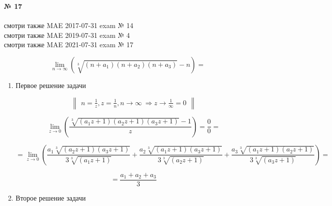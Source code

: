 \documentclass{article}
\begin{document}
\textbf{№ 17} 
\\
\\ смотри также {\color{red}MAE} 2017-07-31 exam № 14
\\ смотри также {\color{red}MAE} 2019-07-31 exam № 4
\\ смотри также {\color{red}MAE} 2021-07-31 exam № 17

\begingroup
$$ \lim_{n\to \infty} \left( \sqrt[3]{(n+a_1)(n+a_2)(n+a_3)} - n \right) 
= $$

\begin{enumerate}
\item Первое решение задачи

$$ \begin{Vmatrix} n=\frac{1}{z}, z=\frac{1}{n}, n\to \infty \ \Rightarrow z\to\frac{1}{\infty}=0 \end{Vmatrix} $$

$$ \lim_{z\to 0} \left(\frac{\sqrt[3]{(a_1z+1)(a_2z+1)(a_3z+1)} - 1}{z} \right) 
= \frac{0}{0}
= $$

$$ = \lim_{z\to 0} \left( \frac{a_1\sqrt[3]{(a_2z+1)(a_3z+1)}}{3\sqrt[3]{(a_1z+1)}} 
+ \frac{a_2\sqrt[3]{(a_1z+1)(a_3z+1)}}{3\sqrt[3]{(a_2z+1)}} 
+ \frac{a_3\sqrt[3]{(a_1z+1)(a_2z+1)}}{3\sqrt[3]{(a_3z+1)}} \right)
= $$

$$ = \frac{a_1+a_2+a_3}{3} $$

\item Второе решение задачи

\end{enumerate}
\endgroup
\end{document}
